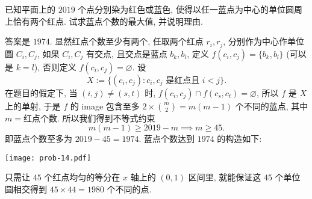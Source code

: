 \begin{prob}
\label{prob:prob-14}
已知平面上的 $2019$ 个点分别染为红色或蓝色,
使得以任一蓝点为中心的单位圆周上恰有两个红点.
试求蓝点个数的最大值, 并说明理由.
\end{prob}

\begin{soln}
答案是 $\boxed{1974.}$ 显然红点个数至少有两个, 任取两个红点 $r_i, r_j$,
分别作为中心作单位圆 $C_i, C_j$, 如果 $C_i, C_j$ 有交点,
且交点是蓝点 $b_k, b_l$, 定义 $f(c_i, c_j) = \{b_k, b_l\}$ (可以是 $k = l$),
否则定义 $f(c_i, c_j) = \varnothing$. 设
\[
X := \{(c_i,c_j): \text{$c_i,c_j$ 是红点且 $i < j$}\}.
\]
在题目的假定下, 当 $(i,j) \ne (s,t)$ 时,
$f(c_i,c_j) \cap f(c_s, c_t) = \varnothing$,
所以 $f$ 是 $X$ 上的单射, 于是 $f$ 的 image 包含至多
$2\times\binom{m}{2} = m(m-1)$ 个不同的蓝点, 其中$m = \text{红点个数}$.
所以我们得到不等式约束
\[
m(m-1) \ge 2019 - m \implies m \ge 45.
\]
即蓝点个数至多为 $2019 - 45 = 1974$.
蓝点个数达到 $1974$ 的构造如下:

\begin{center}
\texttt{[image: prob-14.pdf]}
\end{center}

只需让 $45$ 个红点均匀的等分在 $x$ 轴上的 $(0, 1)$ 区间里,
就能保证这 $45$ 个单位圆相交得到 $45 \times 44 = 1980$ 个不同的点.
\end{soln}
